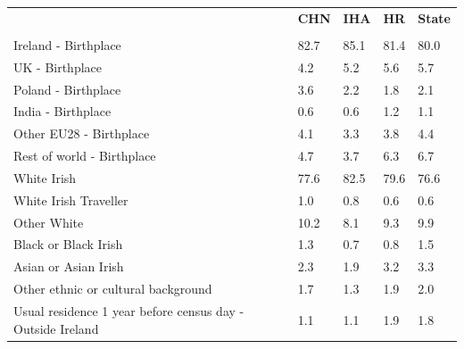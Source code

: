 \documentclass{article}
\begin{document}
\pagebreak
\begin{table}[h]	
\centering
		\begin{tabular}{KTTTT}
  \hline
& \textbf{CHN} & \textbf{IHA} & \textbf{HR}& \textbf{State}\\ 
  \hline
    \\ 
    \hline
Ireland - Birthplace & 82.7& 85.1& 81.4& 80.0\\
UK - Birthplace & 4.2& 5.2& 5.6& 5.7\\
Poland - Birthplace & 3.6& 2.2& 1.8& 2.1\\
India - Birthplace & 0.6& 0.6& 1.2& 1.1\\
Other EU28 - Birthplace & 4.1& 3.3& 3.8& 4.4\\
Rest of world - Birthplace & 4.7& 3.7& 6.3& 6.7\\
    \hline
White Irish & 77.6& 82.5& 79.6& 76.6\\
White Irish Traveller & 1.0& 0.8& 0.6& 0.6\\
Other White & 10.2&  8.1&  9.3&  9.9\\
Black or Black Irish & 1.3& 0.7& 0.8& 1.5\\
Asian or Asian Irish & 2.3& 1.9& 3.2& 3.3\\
Other ethnic or cultural background & 1.7& 1.3& 1.9& 2.0\\
    \hline
Usual residence 1 year before census day - Outside Ireland & 1.1& 1.1& 1.9& 1.8\\


\end{tabular}
\end{table}
\end{document}
